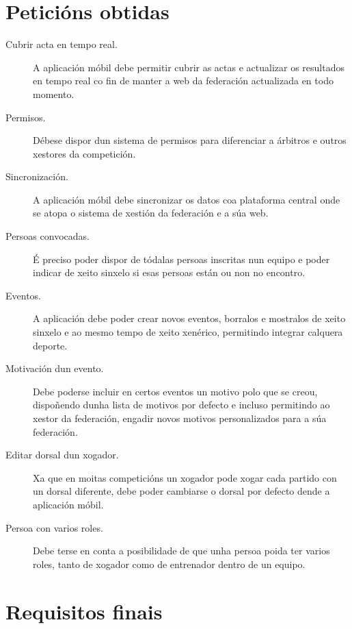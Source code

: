   \section{Peticións obtidas}
  \label{sec:analisis:obtido}
    \begin{description}
     \item [Cubrir acta en tempo real.] A aplicación móbil debe permitir cubrir 
as actas e actualizar os resultados en tempo real co fin de manter a web da 
federación actualizada en todo momento.

     \item [Permisos.] Débese dispor dun sistema de permisos para diferenciar a 
árbitros e outros xestores da competición.

     \item [Sincronización.] A aplicación móbil debe sincronizar os datos coa 
plataforma central onde se atopa o sistema de xestión da federación e a súa web.

     \item [Persoas convocadas.] É preciso poder dispor de tódalas persoas 
inscritas nun equipo e poder indicar de xeito sinxelo si esas persoas están ou 
non no encontro.

     \item [Eventos.] A aplicación debe poder crear novos eventos, borralos e 
mostralos de xeito sinxelo e ao mesmo tempo de xeito xenérico, permitindo
integrar calquera deporte.

     \item [Motivación dun evento.] Debe poderse incluir en certos eventos un 
motivo polo que se creou, dispoñendo dunha lista de motivos por 
defecto e incluso permitindo ao xestor da federación, engadir novos motivos 
personalizados para a súa federación.

     \item [Editar dorsal dun xogador.] Xa que en moitas competicións un 
xogador pode xogar cada partido con un dorsal diferente, debe poder cambiarse o 
dorsal por defecto dende a aplicación móbil.

     \item [Persoa con varios roles.] Debe terse en conta a posibilidade de que 
unha persoa poida ter varios roles, tanto de xogador como de entrenador dentro 
de un equipo.

    \end{description}

  \section{Requisitos finais}
  \label{sec:analisis:requisitos}
